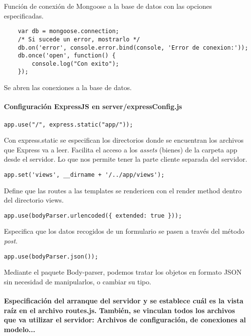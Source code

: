 Función de conexión de Mongoose a la base de datos con las opciones especificadas.



\medskip
\begin{lstlisting}
	var db = mongoose.connection;
	/* Si sucede un error, mostrarlo */
	db.on('error', console.error.bind(console, 'Error de conexion:'));
	db.once('open', function() {
		console.log("Con exito");
	});
\end{lstlisting}



Se abren las conexiones a la base de datos.


 
\paragraph*{Configuración ExpressJS en server/expressConfig.js}


\medskip
\begin{lstlisting}
app.use("/", express.static("app/"));
\end{lstlisting}


Con express.static se especifican los directorios donde se encuentran los archivos que Express va a leer. Facilita el acceso a los \textit{assets} (bienes) de la carpeta app desde el servidor. Lo que nos permite tener la parte cliente separada del servidor. 


\medskip
\begin{lstlisting}
app.set('views', __dirname + '/../app/views');
\end{lstlisting}


Define que las routes a las templates se rendericen con el render method dentro del directorio views.


\medskip
\begin{lstlisting}
app.use(bodyParser.urlencoded({ extended: true }));
\end{lstlisting}


Especifica que los datos recogidos de un formulario se pasen a través del método \textit{post}.


\medskip
\begin{lstlisting}
app.use(bodyParser.json());
\end{lstlisting}


Mediante el paquete Body-parser, podemos tratar los objetos en formato JSON sin necesidad de manipularlos, o cambiar su tipo.

 
\paragraph*{Especificación del arranque del servidor y se establece cuál es la vista raíz en el archivo routes.js. También, se vinculan todos los archivos que va utilizar el servidor: Archivos de configuración, de conexiones al modelo...}


